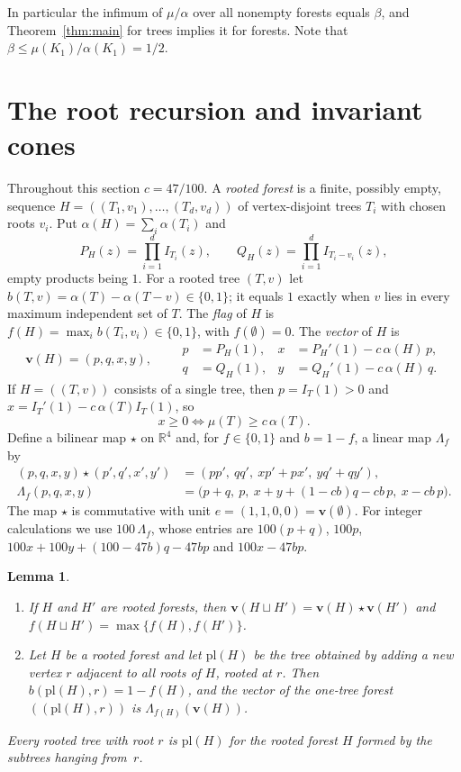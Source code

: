 \documentclass{amsart}
\numberwithin{equation}{section}
\theoremstyle{plain}
\newtheorem{lemma}[theorem]{Lemma}
\theoremstyle{definition}
\theoremstyle{remark}
\newcommand{\R}{\mathbb{R}}
\newcommand{\vc}{\mathbf{v}}
\begin{document}
In particular the infimum of $\mu/\alpha$ over all nonempty forests equals $\beta$, and Theorem~\ref{thm:main} for trees implies it for forests. Note that $\beta\le\mu(K_1)/\alpha(K_1)=1/2$.

\section{The root recursion and invariant cones}\label{sec:cones}

Throughout this section $c=47/100$. A \emph{rooted forest} is a finite, possibly empty, sequence $H=((T_1,v_1),\dots,(T_d,v_d))$ of vertex-disjoint trees $T_i$ with chosen roots $v_i$. Put $\alpha(H)=\sum_i\alpha(T_i)$ and
\[
P_H(z)=\prod_{i=1}^dI_{T_i}(z),\qquad Q_H(z)=\prod_{i=1}^dI_{T_i-v_i}(z),
\]
empty products being $1$. For a rooted tree $(T,v)$ let $b(T,v)=\alpha(T)-\alpha(T-v)\in\{0,1\}$; it equals $1$ exactly when $v$ lies in every maximum independent set of $T$. The \emph{flag} of $H$ is $f(H)=\max_ib(T_i,v_i)\in\{0,1\}$, with $f(\emptyset)=0$. The \emph{vector} of $H$ is
\begin{equation}\label{eq:vector}
\vc(H)=(p,q,x,y),\qquad
\begin{aligned}
p&=P_H(1), & x&=P_H'(1)-c\,\alpha(H)\,p,\\
q&=Q_H(1), & y&=Q_H'(1)-c\,\alpha(H)\,q .
\end{aligned}
\end{equation}
If $H=((T,v))$ consists of a single tree, then $p=I_T(1)>0$ and $x=I_T'(1)-c\,\alpha(T)I_T(1)$, so
\begin{equation}\label{eq:thirdcoord}
x\ge0\iff\mu(T)\ge c\,\alpha(T).
\end{equation}
Define a bilinear map $\star$ on $\R^4$ and, for $f\in\{0,1\}$ and $b=1-f$, a linear map $\Lambda_f$ by
\begin{align}
(p,q,x,y)\star(p',q',x',y')&=(pp',\ qq',\ xp'+px',\ yq'+qy'),\label{eq:product}\\
\Lambda_f(p,q,x,y)&=\bigl(p+q,\ p,\ x+y+(1-cb)q-cb\,p,\ x-cb\,p\bigr).\label{eq:plant}
\end{align}
The map $\star$ is commutative with unit $e=(1,1,0,0)=\vc(\emptyset)$. For integer calculations we use $100\,\Lambda_f$, whose entries are $100(p+q)$, $100p$, $100x+100y+(100-47b)q-47bp$ and $100x-47bp$.

\begin{lemma}\label{lem:recursion}
\begin{enumerate}[label=\textup{(\alph*)},leftmargin=*]
\item If $H$ and $H'$ are rooted forests, then $\vc(H\sqcup H')=\vc(H)\star\vc(H')$ and $f(H\sqcup H')=\max\{f(H),f(H')\}$.
\item Let $H$ be a rooted forest and let $\mathrm{pl}(H)$ be the tree obtained by adding a new vertex $r$ adjacent to all roots of $H$, rooted at $r$. Then $b(\mathrm{pl}(H),r)=1-f(H)$, and the vector of the one-tree forest $((\mathrm{pl}(H),r))$ is $\Lambda_{f(H)}(\vc(H))$.
\end{enumerate}
Every rooted tree with root $r$ is $\mathrm{pl}(H)$ for the rooted forest $H$ formed by the subtrees hanging from~$r$.
\end{lemma}
\end{document}
